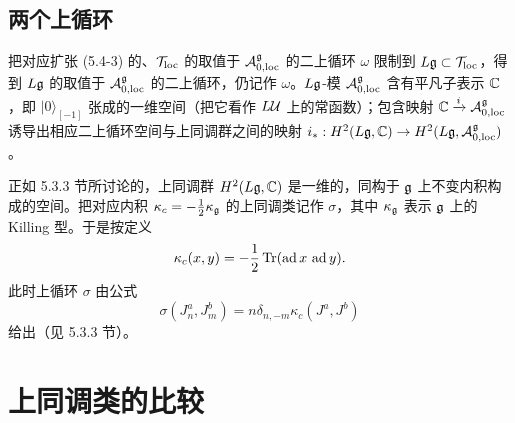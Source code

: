 \subsection{两个上循环}

把对应扩张 (5.4-3) 的、$\mathcal{T}_{\mathrm{loc}}$ 的取值于 $\mathcal{A}^{\mathfrak{g}}_{0,\mathrm{loc}}$ 的二上循环 $\omega$ 限制到 $L\mathfrak{g}\subset\mathcal{T}_{\mathrm{loc}}$，得到 $L\mathfrak{g}$ 的取值于 $\mathcal{A}^{\mathfrak{g}}_{0,\mathrm{loc}}$ 的二上循环，仍记作 $\omega$。$L\mathfrak{g}$-模 $\mathcal{A}^{\mathfrak{g}}_{0,\mathrm{loc}}$ 含有平凡子表示 $\mathbb{C}$，即 $|0\rangle_{[-1]}$ 张成的一维空间（把它看作 $L\mathcal{U}$ 上的常函数）；包含映射 $\mathbb{C}\xrightarrow{i}\mathcal{A}^{\mathfrak{g}}_{0,\mathrm{loc}}$ 诱导出相应二上循环空间与上同调群之间的映射 $i_*: H^2(L\mathfrak{g},\mathbb{C})\to H^2(L\mathfrak{g},\mathcal{A}^{\mathfrak{g}}_{0,\mathrm{loc}})$。

正如 5.3.3 节所讨论的，上同调群 $H^2(L\mathfrak{g},\mathbb{C})$ 是一维的，同构于 $\mathfrak{g}$ 上不变内积构成的空间。把对应内积 $\kappa_c = -\tfrac12\kappa_{\mathfrak{g}}$ 的上同调类记作 $\sigma$，其中 $\kappa_{\mathfrak{g}}$ 表示 $\mathfrak{g}$ 上的 Killing 型。于是按定义
\[
\kappa_c(x,y) = -\frac{1}{2}\operatorname{Tr}(\operatorname{ad}x\,\operatorname{ad}y).
\]
此时上循环 $\sigma$ 由公式
\begin{equation}
\sigma(J^a_n,J^b_m) = n\delta_{n,-m}\kappa_c(J^a,J^b)
\tag{5.5-5}
\end{equation}
给出（见 5.3.3 节）。


\section{上同调类的比较}

